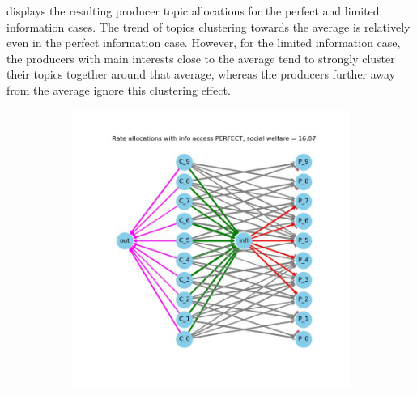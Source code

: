 \documentclass[11pt, letterpaper]{article}
\begin{document}
 displays the resulting producer topic allocations for the perfect and limited information cases. The trend of topics clustering towards the average is relatively even in the perfect information case. However, for the limited information case, the producers with main interests close to the average tend to strongly cluster their topics together around that average, whereas the producers further away from the average ignore this clustering effect.

\begin{figure}[h]
    \centering
    \begin{adjustbox}{max width=1.5\textwidth,center}
        \begin{subfigure}[b]{0.6\textwidth}
            \includegraphics[width=\linewidth]{"figures/lim/1_allocs.jpg"}
        \end{subfigure}
        \begin{subfigure}[b]{0.6\textwidth}

\end{subfigure}
\end{adjustbox}
\end{figure}
\end{document}
